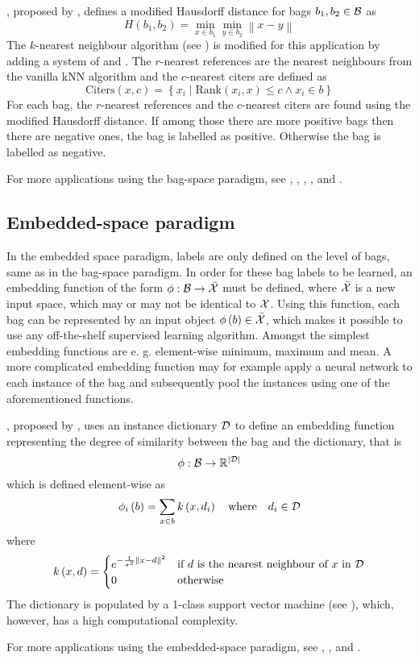 , proposed by \cite{wang_solving_2000}, defines a modified Hausdorff distance for bags \( b_1, b_2 \in \mathcal{B} \) as
\[ H \left( b_1, b_2 \right) = \min_{x \in b_1} \min_{y \in b_2} \left\lVert x - y \right\rVert \]
The \( k \)-nearest neighbour algorithm (see \cite{dasarathy_nearest_1991}) is modified for this application by adding a system of  and . The \( r \)-nearest references are the nearest neighbours from the vanilla kNN algorithm and the \( c \)-nearest citers are defined as
\[ \mathrm{Citers} \left( x, c \right) = \left\{ x_i \middle| \mathrm{Rank} \left( x_i, x \right) \leq c \wedge x_i \in b \right\} \]
For each bag, the \( r \)-nearest references and the \( c \)-nearest citers are found using the modified Hausdorff distance. If among those there are more positive bags then there are negative ones, the bag is labelled as positive. Otherwise the bag is labelled as negative.

For more applications using the bag-space paradigm, see \cite{wang_solving_2000}, \cite{kwok_marginalized_2007}, \cite{gartner_multi-instance_2002}, \cite{haussler_convolution_1999}, \cite{zhou_multi-instance_2009} and \cite{muandet_learning_2012}.

\subsection{Embedded-space paradigm}\label{embedded-space-paradigm}
In the embedded space paradigm, labels are only defined on the level of bags, same as in the bag-space paradigm. In order for these bag labels to be learned, an embedding function of the form \( \phi : \mathcal{B} \to \bar{\mathcal{X}} \) must be defined, where \( \bar{\mathcal{X}} \) is a new input space, which may or may not be identical to \( \mathcal{X} \). Using this function, each bag can be represented by an input object \( \phi \left( b \right) \in \bar{\mathcal{X}} \), which makes it possible to use any off-the-shelf supervised learning algorithm. Amongst the simplest embedding functions are e. g. element-wise minimum, maximum and mean. A more complicated embedding function may for example apply a neural network to each instance of the bag and subsequently pool the instances using one of the aforementioned functions.

, proposed by \cite{chen_miles:_2006}, uses an instance dictionary \( \mathcal{D} \) to define an embedding function representing the degree of similarity between the bag and the dictionary, that is
\[ \phi : \mathcal{B} \to \mathbb{R}^{\left\lvert \mathcal{D} \right\rvert} \]
which is defined element-wise as
\[ \phi_i \left( b \right) = \sum_{x \in b} k \left( x, d_i \right) \quad \text{where} \quad d_i \in \mathcal{D} \]
where
\[ k \left( x, d \right) = \begin{cases}
		e^{- \frac{1}{\sigma^2} \left\lVert x - d \right\rVert^2} &\text{if } d \text{ is the nearest neighbour of } x \text{ in } \mathcal{D} \\
		0 &\text{otherwise}
	\end{cases} \]
The dictionary is populated by a 1-class support vector machine (see \cite{zhu_1-norm_2004}), which, however, has a high computational complexity.

For more applications using the embedded-space paradigm, see \cite{cheplygina_multiple_2015}, \cite{chen_image_2004} \cite{foulds_learning_2008}, \cite{zhang_multi-instance_2009} and \cite{dedic_hierarchicke_2017}.


